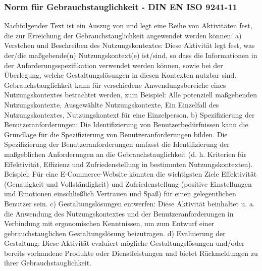 \subsubsection{Norm für Gebrauchstauglichkeit - DIN EN ISO 9241-11}
Nachfolgender Text ist ein Auszug von \cite{DIN1} und legt eine Reihe von Aktivitäten fest, die zur Erreichung der Gebrauchstauglichkeit angewendet werden können: \newline
\newline
a) Verstehen und Beschreiben des Nutzungskontextes:\newline
Diese Aktivität legt fest, was der/die maßgebende(n) Nutzungskontext(e) ist/sind, so dass die Informationen in der Anforderungsspezifikation verwendet werden können, sowie bei der Überlegung, welche Gestaltungslösungen in diesen Kontexten nutzbar sind.\newline
Gebrauchstauglichkeit kann für verschiedene Anwendungsbereiche eines Nutzungskontextes betrachtet werden, zum Beispiel: Alle potenziell maßgebenden Nutzungskontexte, Ausgewählte Nutzungskontexte, Ein Einzelfall des Nutzungskontextes, Nutzungskontext für eine Einzelperson.\newline
\newline
b) Spezifizierung der Benutzeranforderungen:\newline
Die Identifizierung von Benutzerbedürfnissen kann die Grundlage für die Spezifizierung von Benutzeranforderungen bilden. Die Spezifizierung der Benutzeranforderungen umfasst die Identifizierung der maßgeblichen Anforderungen an die Gebrauchstauglichkeit (d. h. Kriterien für Effektivität, Effizienz und Zufriedenstellung in bestimmten Nutzungskontexten). \newline
Beispiel: Für eine E-Commerce-Website könnten die wichtigsten Ziele Effektivität (Genauigkeit und Vollständigkeit) und Zufriedenstellung (positive Einstellungen und Emotionen einschließlich Vertrauen und Spaß) für einen gelegentlichen Benutzer sein.\newline
\newline
c) Gestaltungslösungen entwerfen:\newline
Diese Aktivität beinhaltet u. a. die Anwendung des Nutzungskontextes und der Benutzeranforderungen in Verbindung mit ergonomischen Kenntnissen, um zum Entwurf einer gebrauchstauglichen Gestaltungslösung beizutragen.\newline
\newline
d) Evaluierung der Gestaltung:\newline
Diese Aktivität evaluiert mögliche Gestaltungslösungen und/oder bereits vorhandene Produkte oder Dienstleistungen und bietet Rückmeldungen zu ihrer Gebrauchstauglichkeit.\newline
